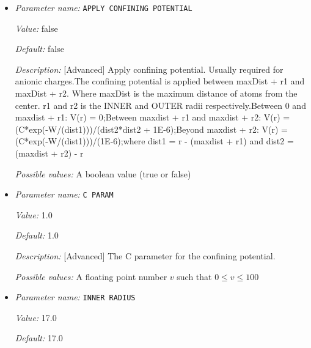 \begin{itemize}
\item {\it Parameter name:} {\tt APPLY CONFINING POTENTIAL}
\label{parameters:DFT functional parameters/CONFINING POTENTIAL parameters/APPLY CONFINING POTENTIAL}
\label{parameters:DFT_20functional_20parameters/CONFINING_20POTENTIAL_20parameters/APPLY_20CONFINING_20POTENTIAL}


{\it Value:} false


{\it Default:} false


{\it Description:} [Advanced] Apply confining potential. Usually required for anionic charges.The confining potential is applied between maxDist + r1 and maxDist + r2. Where maxDist is the maximum distance of atoms from the center. r1 and r2 is the INNER and OUTER radii respectively.Between 0 and maxdist + r1: V(r) = 0;Between maxdist + r1 and maxdist + r2: V(r) = (C*exp(-W/(dist1)))/(dist2*dist2 + 1E-6);Beyond maxdist + r2: V(r) = (C*exp(-W/(dist1)))/(1E-6);where dist1 = r - (maxdist + r1) and dist2 = (maxdist + r2) - r


{\it Possible values:} A boolean value (true or false)
\item {\it Parameter name:} {\tt C PARAM}
\label{parameters:DFT functional parameters/CONFINING POTENTIAL parameters/C PARAM}
\label{parameters:DFT_20functional_20parameters/CONFINING_20POTENTIAL_20parameters/C_20PARAM}


{\it Value:} 1.0


{\it Default:} 1.0


{\it Description:} [Advanced] The C parameter for the confining potential.


{\it Possible values:} A floating point number $v$ such that $0 \leq v \leq 100$
\item {\it Parameter name:} {\tt INNER RADIUS}
\label{parameters:DFT functional parameters/CONFINING POTENTIAL parameters/INNER RADIUS}
\label{parameters:DFT_20functional_20parameters/CONFINING_20POTENTIAL_20parameters/INNER_20RADIUS}


{\it Value:} 17.0


{\it Default:} 17.0



\end{itemize}

